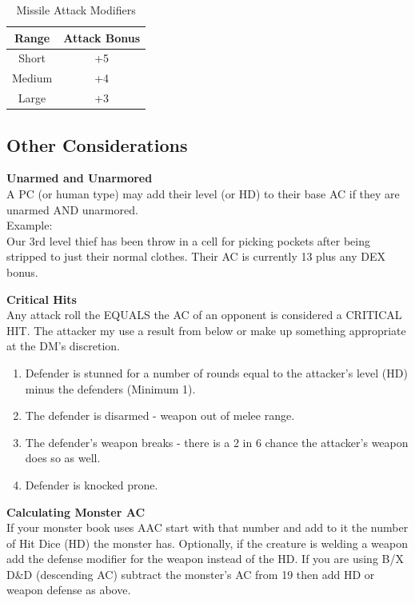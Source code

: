 \documentclass[letterpaper,sansserif,tightsqueeze]{rpg-module}
\begin{document}
\begin{table}[h!]
	\centering
	\begin{tabular}{|c|c|}
		\hline
		\textbf{Range}	& \textbf{Attack Bonus}	\\ \hline
		Short	& +5 	\\ \hline
		Medium	& +4 	\\ \hline
		Large	& +3 	\\ \hline
	\end{tabular}
	\caption{Missile Attack Modifiers}
	\label{table:MissileAttackModifiers}
\end{table}

\vspace{0.5cm}

\subsection*{Other Considerations}
\textbf{Unarmed and Unarmored}\\
A PC (or human type) may add their level (or HD) to their base AC if they are unarmed AND unarmored.\\
Example:\\
Our 3rd level thief has been throw in a cell for picking pockets after being stripped to just their normal clothes. Their AC is currently 13 plus any DEX bonus.

\vspace{0.5cm}

\textbf{Critical Hits}\\
Any attack roll the EQUALS the AC of an opponent is considered a CRITICAL HIT. The attacker my use a result from below or make up something appropriate at the DM’s discretion.
\begin{enumerate}
	\item Defender is stunned for a number of rounds equal to the attacker’s level (HD) minus the defenders (Minimum 1).
	\item The defender is disarmed - weapon out of melee range.
	\item The defender’s weapon breaks - there is a 2 in 6 chance the attacker’s weapon does so as well.
	\item Defender is knocked prone.
\end{enumerate}

\textbf{Calculating Monster AC}\\
\label{subsection:MonsterAC}
If your monster book uses AAC start with that number and add to it the number of Hit Dice (HD) the monster has. Optionally, if the creature is welding a weapon add the defense modifier for the weapon instead of the HD. If you are using B/X D\&D (descending AC) subtract the monster’s AC from 19 then add HD or weapon defense as above.
\end{document}
